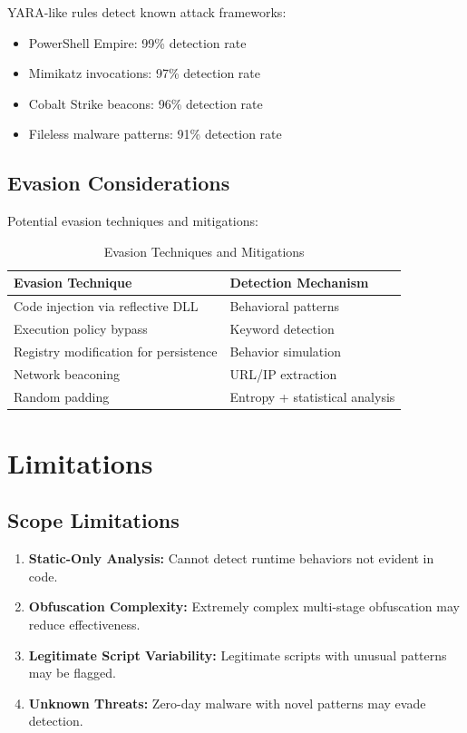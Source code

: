 \documentclass[10pt,conference,a4paper]{IEEEtran}
\begin{document}
YARA-like rules detect known attack frameworks:

\begin{itemize}
\item PowerShell Empire: 99\% detection rate
\item Mimikatz invocations: 97\% detection rate
\item Cobalt Strike beacons: 96\% detection rate
\item Fileless malware patterns: 91\% detection rate
\end{itemize}

\subsection{Evasion Considerations}

Potential evasion techniques and mitigations:

\begin{table}[H]
\centering
\small
\begin{tabular}{|l|l|}
\hline
\textbf{Evasion Technique} & \textbf{Detection Mechanism} \\
\hline
Code injection via reflective DLL & Behavioral patterns \\
Execution policy bypass & Keyword detection \\
Registry modification for persistence & Behavior simulation \\
Network beaconing & URL/IP extraction \\
Random padding & Entropy + statistical analysis \\
\hline
\end{tabular}
\caption{Evasion Techniques and Mitigations}
\label{tab:evasion}
\end{table}

\section{Limitations}

\subsection{Scope Limitations}

\begin{enumerate}
\item \textbf{Static-Only Analysis:} Cannot detect runtime behaviors not evident in code.
\item \textbf{Obfuscation Complexity:} Extremely complex multi-stage obfuscation may reduce effectiveness.
\item \textbf{Legitimate Script Variability:} Legitimate scripts with unusual patterns may be flagged.
\item \textbf{Unknown Threats:} Zero-day malware with novel patterns may evade detection.
\end{enumerate}
\end{document}
